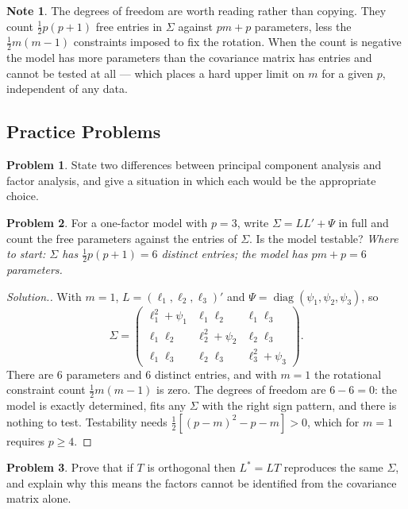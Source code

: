 \documentclass[11pt,a4paper]{article}
\theoremstyle{definition}
\newtheorem{note}[thm]{Note}
\newtheorem{problemx}{Problem}[section]
\newenvironment{problem}{\begin{problemx}}{\end{problemx}}
\newenvironment{solution}
  {\renewcommand{\qedsymbol}{}\begin{proof}[\textit{Solution}.]}
  {\end{proof}}
\begin{document}
\begin{note}
The degrees of freedom are worth reading rather than copying. They count
$\tfrac12 p(p+1)$ free entries in $\Sigma$ against $pm+p$ parameters, less the
$\tfrac12 m(m-1)$ constraints imposed to fix the rotation. When the count is
negative the model has more parameters than the covariance matrix has entries
and cannot be tested at all --- which places a hard upper limit on $m$ for a
given $p$, independent of any data.
\end{note}

\newpage

\subsection{Practice Problems}

\begin{problem}
State two differences between principal component analysis and factor analysis,
and give a situation in which each would be the appropriate choice.
\end{problem}

\begin{problem}
For a one-factor model with $p=3$, write $\Sigma=LL'+\Psi$ in full and count the
free parameters against the entries of $\Sigma$. Is the model testable?
\emph{Where to start: $\Sigma$ has $\tfrac12 p(p+1)=6$ distinct entries; the
model has $pm+p=6$ parameters.}
\end{problem}

\begin{solution}
With $m=1$, $L=(\ell_1,\ell_2,\ell_3)'$ and
$\Psi=\operatorname{diag}(\psi_1,\psi_2,\psi_3)$, so
$$\Sigma = \begin{pmatrix}
\ell_1^{2}+\psi_1 & \ell_1\ell_2 & \ell_1\ell_3\\
\ell_1\ell_2 & \ell_2^{2}+\psi_2 & \ell_2\ell_3\\
\ell_1\ell_3 & \ell_2\ell_3 & \ell_3^{2}+\psi_3
\end{pmatrix}.$$
There are $6$ parameters and $6$ distinct entries, and with $m=1$ the
rotational constraint count $\tfrac12 m(m-1)$ is zero. The degrees of freedom
are $6-6=0$: the model is exactly determined, fits any $\Sigma$ with the right
sign pattern, and there is nothing to test. Testability needs
$\tfrac12\left[(p-m)^{2}-p-m\right]>0$, which for $m=1$ requires $p\geq4$.
\end{solution}

\begin{problem}
Prove that if $T$ is orthogonal then $L^{*}=LT$ reproduces the same $\Sigma$,
and explain why this means the factors cannot be identified from the covariance
matrix alone.
\end{problem}
\end{document}
